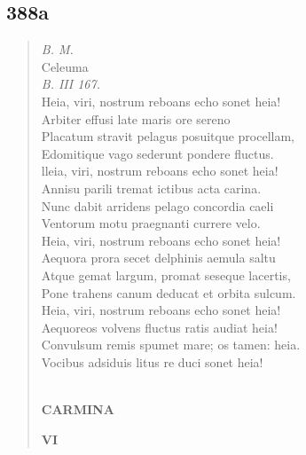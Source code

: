 \documentclass[11pt, a4paper]{report}
\begin{document}
            \subsection*{388a}
      \begin{verse}
      \textit{B. M.} \\  \lbrack Celeuma \rbrack  \\ \textit{B. III 167.} \\ Heia, viri, nostrum reboans echo sonet heia! \\ Arbiter effusi late maris ore sereno \\ Placatum stravit pelagus posuitque procellam, \\ Edomitique vago sederunt pondere fluctus. \\ lleia, viri, nostrum reboans echo sonet heia! \\ Annisu parili tremat ictibus acta carina. \\ Nunc dabit arridens pelago concordia caeli \\ Ventorum motu praegnanti currere velo. \\ Heia, viri, nostrum reboans echo sonet heia! \\ Aequora prora secet delphinis aemula saltu \\ Atque gemat largum, promat seseque lacertis, \\ Pone trahens canum deducat  \lbrack et orbita sulcum. \\ Heia, viri, nostrum reboans echo sonet heia! \\ Aequoreos volvens fluctus  \lbrack ratis audiat \rbrack  heia! \\ Convulsum remis spumet mare; os tamen: heia. \\ Vocibus adsiduis litus re \lbrack duci \rbrack  sonet heia! \\ 
        ﻿\pagebreak 
    \begin{center} \textbf{CARMINA} \end{center}\begin{center} \textbf{VI} \end{center}
      \end{verse}
  
            \subsection*{}
      \begin{verse}
      \end{verse}
  
\end{document}
